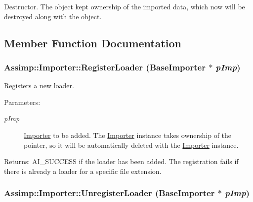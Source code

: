 Destructor. The object kept ownership of the imported data, which now will be destroyed along with the object. 

\subsection{Member Function Documentation}
\hypertarget{class_assimp_1_1_importer_3846294ffe76d91a1d3096d22d7c6b7d}{
\subsubsection[RegisterLoader]{ Assimp::Importer::RegisterLoader (BaseImporter $\ast$ {\em pImp})}}
\label{class_assimp_1_1_importer_3846294ffe76d91a1d3096d22d7c6b7d}


Registers a new loader.

\begin{Desc}
\item[Parameters:]
\begin{description}
\item[{\em pImp}]\hyperlink{class_assimp_1_1_importer}{Importer} to be added. The \hyperlink{class_assimp_1_1_importer}{Importer} instance takes ownership of the pointer, so it will be automatically deleted with the \hyperlink{class_assimp_1_1_importer}{Importer} instance. \end{description}
\end{Desc}
\begin{Desc}
\item[Returns:]AI\_\-SUCCESS if the loader has been added. The registration fails if there is already a loader for a specific file extension. \end{Desc}
\hypertarget{class_assimp_1_1_importer_3b1f5af2c763b13aca0f324b19001722}{
\subsubsection[UnregisterLoader]{ Assimp::Importer::UnregisterLoader (BaseImporter $\ast$ {\em pImp})}}
\label{class_assimp_1_1_importer_3b1f5af2c763b13aca0f324b19001722}


